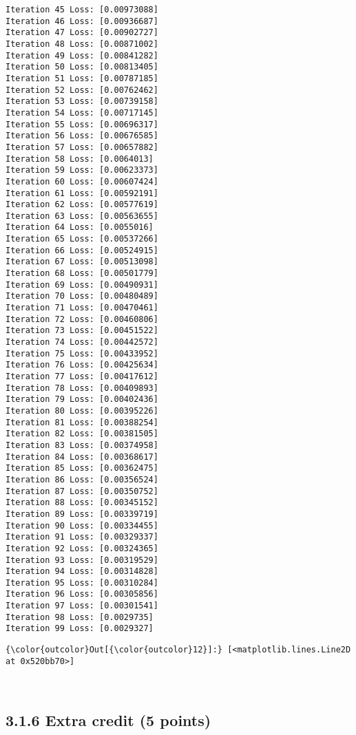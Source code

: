 \documentclass[11pt]{article}
\begin{document}
\begin{Verbatim}[commandchars=\\\{\}]
Iteration 45 Loss: [0.00973088]
Iteration 46 Loss: [0.00936687]
Iteration 47 Loss: [0.00902727]
Iteration 48 Loss: [0.00871002]
Iteration 49 Loss: [0.00841282]
Iteration 50 Loss: [0.00813405]
Iteration 51 Loss: [0.00787185]
Iteration 52 Loss: [0.00762462]
Iteration 53 Loss: [0.00739158]
Iteration 54 Loss: [0.00717145]
Iteration 55 Loss: [0.00696317]
Iteration 56 Loss: [0.00676585]
Iteration 57 Loss: [0.00657882]
Iteration 58 Loss: [0.0064013]
Iteration 59 Loss: [0.00623373]
Iteration 60 Loss: [0.00607424]
Iteration 61 Loss: [0.00592191]
Iteration 62 Loss: [0.00577619]
Iteration 63 Loss: [0.00563655]
Iteration 64 Loss: [0.0055016]
Iteration 65 Loss: [0.00537266]
Iteration 66 Loss: [0.00524915]
Iteration 67 Loss: [0.00513098]
Iteration 68 Loss: [0.00501779]
Iteration 69 Loss: [0.00490931]
Iteration 70 Loss: [0.00480489]
Iteration 71 Loss: [0.00470461]
Iteration 72 Loss: [0.00460806]
Iteration 73 Loss: [0.00451522]
Iteration 74 Loss: [0.00442572]
Iteration 75 Loss: [0.00433952]
Iteration 76 Loss: [0.00425634]
Iteration 77 Loss: [0.00417612]
Iteration 78 Loss: [0.00409893]
Iteration 79 Loss: [0.00402436]
Iteration 80 Loss: [0.00395226]
Iteration 81 Loss: [0.00388254]
Iteration 82 Loss: [0.00381505]
Iteration 83 Loss: [0.00374958]
Iteration 84 Loss: [0.00368617]
Iteration 85 Loss: [0.00362475]
Iteration 86 Loss: [0.00356524]
Iteration 87 Loss: [0.00350752]
Iteration 88 Loss: [0.00345152]
Iteration 89 Loss: [0.00339719]
Iteration 90 Loss: [0.00334455]
Iteration 91 Loss: [0.00329337]
Iteration 92 Loss: [0.00324365]
Iteration 93 Loss: [0.00319529]
Iteration 94 Loss: [0.00314828]
Iteration 95 Loss: [0.00310284]
Iteration 96 Loss: [0.00305856]
Iteration 97 Loss: [0.00301541]
Iteration 98 Loss: [0.0029735]
Iteration 99 Loss: [0.0029327]

    \end{Verbatim}

\begin{Verbatim}[commandchars=\\\{\}]
{\color{outcolor}Out[{\color{outcolor}12}]:} [<matplotlib.lines.Line2D at 0x520bb70>]
\end{Verbatim}
            
    \begin{center}
    \end{center}
    { \hspace*{\fill} \\}
    
    \subsection{3.1.6 Extra credit (5 points)}\label{extra-credit-5-points}
\end{document}
